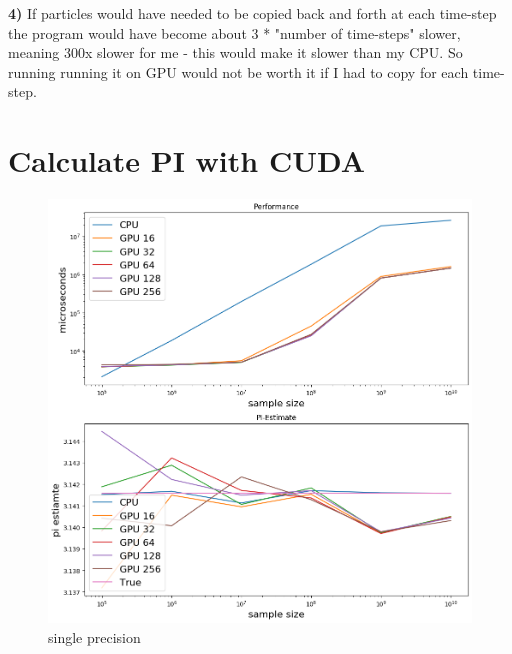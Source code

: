 \documentclass{article}
\begin{document}
\textbf{4)}
If particles would have needed to be copied back and forth at each time-step the program would have become about 3 * "number of time-steps" slower, meaning 300x
slower for me - this would make it slower than my CPU. So running running it on GPU would not be worth it if I had to copy for each time-step.


\section*{Calculate PI with CUDA}%
\label{sec:calculate_pi_with_cuda}

\begin{figure}[H]
  \centering
  \includegraphics[width=0.95\linewidth]{ex_4/pi-float-cpu-vs-gpu.png}
  \caption{single precision}
  \label{fig:}
\end{figure}
\end{document}

